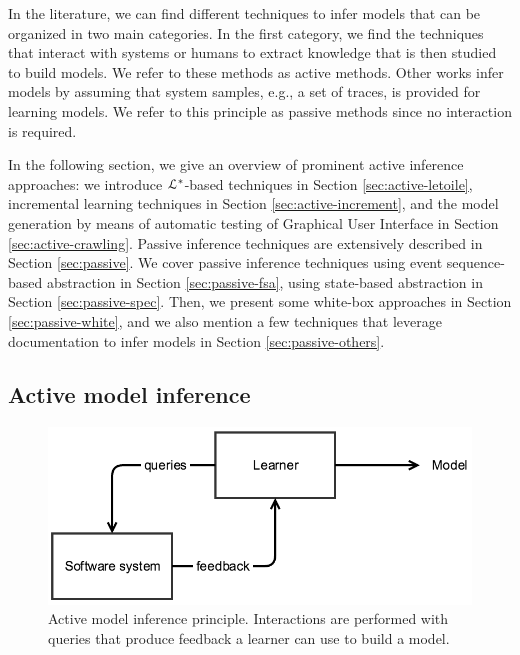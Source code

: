 In the literature, we can find different techniques to infer
models that can be organized in two main categories. In the first
category, we find the techniques that interact with systems or
humans to extract knowledge that is then studied to build models.
We refer to these methods as active methods. Other works infer
models by assuming that system samples, e.g., a set of traces, is
provided for learning models. We refer to this principle as
passive methods since no interaction is required.

In the following section, we give an overview of prominent active
inference approaches: we introduce $\EuScript{L}^*$-based
techniques in Section \ref{sec:active-letoile}, incremental
learning techniques in Section \ref{sec:active-increment}, and
the model generation by means of automatic testing of Graphical
User Interface in Section \ref{sec:active-crawling}. Passive
inference techniques are extensively described in Section
\ref{sec:passive}. We cover passive inference techniques using
event sequence-based abstraction in Section
\ref{sec:passive-fsa}, using state-based abstraction in Section
\ref{sec:passive-spec}. Then, we present some white-box
approaches in Section \ref{sec:passive-white}, and we also
mention a few techniques that leverage documentation to infer
models in Section \ref{sec:passive-others}.


\subsection{Active model inference}
\label{sec:active}

\begin{figure}[h]
    \begin{center}
        \includegraphics[width=0.9\linewidth]{figures/active.png}
    \end{center}

    \caption{Active model inference principle. Interactions are
        performed with queries that produce feedback a learner
        can use to build a model.}
    \label{fig:active}
\end{figure}

